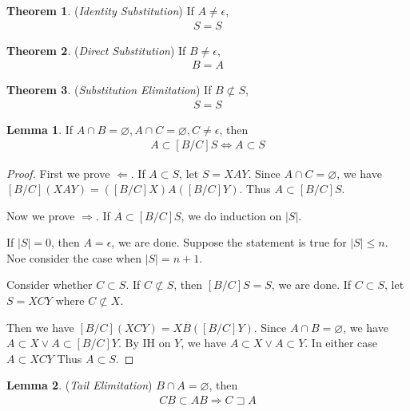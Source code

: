 \documentclass{article}
\theoremstyle{definition}
\newtheorem{theorem}{Theorem}[section]
\newtheorem{lemma}{Lemma}[section]
\begin{document}
\begin{theorem}
    (\emph{Identity Substitution})
    If $A\neq \epsilon$,
    \begin{align}
        [A/A]S = S
    \end{align}
\end{theorem}

\begin{theorem}
    (\emph{Direct Substitution})
    If $B\neq \epsilon$,
    \begin{align}
        [A/B]B = A
    \end{align}
\end{theorem}

\begin{theorem}
    (\emph{Substitution Elimitation})
    If $B\not\subset S$,
    \begin{align}
        [A/B]S = S
    \end{align}
\end{theorem}

\begin{lemma}
    If $A \cap B = \varnothing, A \cap C = \varnothing, C \neq \epsilon$, then
    \begin{align}
        A\subset [B/C]S \Leftrightarrow A \subset S
    \end{align}
    \label{thm:independent substitution}
\end{lemma}

\begin{proof}
    First we prove $\Leftarrow$.
    If $A \subset S$, let $S = XAY$. Since $A \cap C = \varnothing$, we have $[B/C](XAY) = ([B/C]X)A([B/C]Y)$. Thus $A \subset [B/C]S$.

    Now we prove $\Rightarrow$.
    If $A \subset [B/C]S$, we do induction on $|S|$.

    If $|S| = 0$, then $A = \epsilon$, we are done. Suppose the statement is true for $|S|\leq n$. Noe consider the case when $|S| = n+1$.

    Consider whether $C \subset S$. If $C \not\subset S$, then $[B/C]S = S$, we are done. If $C \subset S$, let $S = XCY$ where $C\not\subset X$.

    Then we have $[B/C](XCY) = XB([B/C]Y)$. Since $A \cap B = \varnothing$, we have $A \subset X \lor A \subset [B/C]Y$. By IH on $Y$, we have $A \subset X \lor A \subset Y$. In either case $A\subset XCY$ Thus $A \subset S$.
\end{proof}

\begin{lemma}
    (\emph{Tail Elimitation})
    $B\cap A=\varnothing$, then
    \begin{align}
        CB\subset AB \Rightarrow C \sqsupset A
    \end{align}
\end{lemma}
\end{document}
